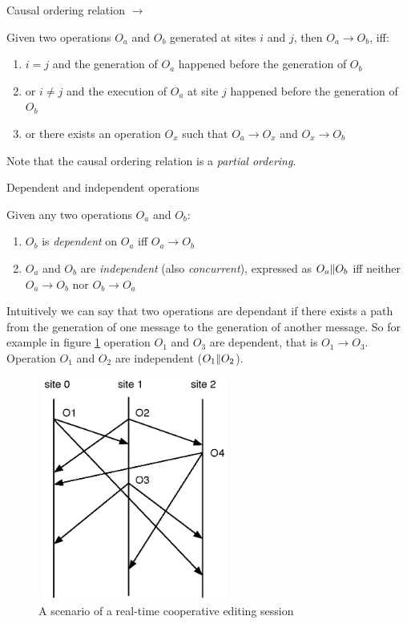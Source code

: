 \begin{defn}
Causal ordering relation $\rightarrow$
\end{defn}

Given two operations $O_{a}$ and $O_{b}$ generated at sites $i$ and $j$, then $O_{a}\rightarrow O_{b}$, iff:
\begin{enumerate}
 \item $i=j$ and the generation of $O_{a}$ happened before the generation of 
       $O_{b}$
 \item or $i \neq j$ and the execution of $O_{a}$ at site $j$ happened before 
       the generation of $O_{b}$
 \item or there exists an operation $O_{x}$ such that $O_{a}\rightarrow O_{x}$
       and $O_{x}\rightarrow O_{b}$
\end{enumerate}

Note that the causal ordering relation is a \emph{partial ordering}.

\begin{defn}
Dependent and independent operations
\end{defn}

Given any two operations $O_{a}$ and $O_{b}$:
\begin{enumerate}
 \item $O_{b}$ is \emph{dependent} on $O_{a}$ iff $O_{a} \rightarrow O_{b}$
 \item $O_{a}$ and $O_{b}$ are \emph{independent} (also \emph{concurrent}), 
       expressed as $O_{a} \Arrowvert O_{b}$ iff neither 
       $O_{a}\rightarrow O_{b}$ nor $O_{b}\rightarrow O_{a}$
\end{enumerate}

Intuitively we can say that two operations are dependant if there exists a path from the generation of one message to the generation of another message. So for example in figure \ref{fig:example1} operation $O_{1}$ and $O_{3}$ are dependent, that is $O_{1}\rightarrow O_{3}$. Operation $O_{1}$ and $O_{2}$ are independent ($O_1 \Arrowvert O_2$). 

\begin{figure}
 \centering
 \includegraphics[width=2.5in,height=2.88in]{../images/finalreport/example1.eps}
 \caption{A scenario of a real-time cooperative editing session}
 \label{fig:example1}
\end{figure}

